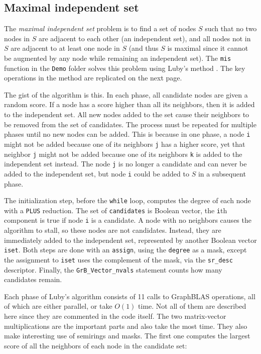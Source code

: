 \documentclass[12pt]{article}
\begin{document}
\subsection{Maximal independent set}
\label{mis}

The {\em maximal independent set} problem is to find a set of nodes $S$ such
that no two nodes in $S$ are adjacent to each other (an independent set), and
all nodes not in $S$ are adjacent to at least one node in $S$ (and thus $S$ is
maximal since it cannot be augmented by any node while remaining an independent
set).  The \verb'mis' function in the \verb'Demo' folder solves this problem
using Luby's method \cite{Luby86}.  The key operations in the method are
replicated on the next page.

The gist of the algorithm is this.  In each phase, all candidate nodes are
given a random score.  If a node has a score higher than all its neighbors,
then it is added to the independent set.  All new nodes added to the set cause
their neighbors to be removed from the set of candidates.  The process must be
repeated for multiple phases until no new nodes can be added.  This is because
in one phase, a node \verb'i' might not be added because one of its neighbors
\verb'j' has a higher score, yet that neighbor \verb'j' might not be added
because one of its neighbors \verb'k' is added to the independent set instead.
The node \verb'j' is no longer a candidate and can never be added to the
independent set, but node \verb'i' could be added to $S$ in a subsequent phase.

The initialization step, before the \verb'while' loop, computes the degree of
each node with a \verb'PLUS' reduction.  The set of \verb'candidates' is
Boolean vector, the \verb'i'th component is true if node \verb'i' is a
candidate.  A node with no neighbors causes the algorithm to stall, so these
nodes are not candidates.  Instead, they are immediately added to the
independent set, represented by another Boolean vector \verb'iset'.  Both steps
are done with an \verb'assign', using the \verb'degree' as a mask, except the
assignment to \verb'iset' uses the complement of the mask, via the
\verb'sr_desc' descriptor.  Finally, the \verb'GrB_Vector_nvals' statement
counts how many candidates remain.

Each phase of Luby's algorithm consists of 11 calls to GraphBLAS operations,
all of which are either parallel, or take $O(1)$ time.
Not all of them are described here since they are commented in the code itself.
The two matrix-vector multiplications are the important parts and also take the
most time.  They also make interesting use of semirings and masks.  The first
one computes the largest score of all the neighbors of each node in the
candidate set:
\end{document}
